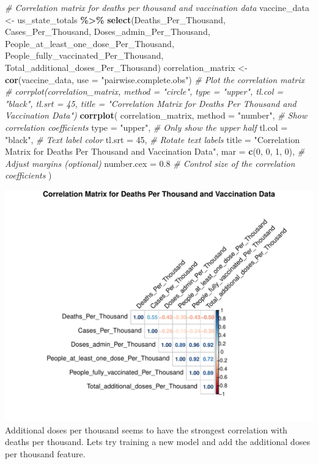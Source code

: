 \documentclass[
]{article}
\newenvironment{Shaded}{\begin{snugshade}}{\end{snugshade}}
\newcommand{\AttributeTok}[1]{\textcolor[rgb]{0.13,0.29,0.53}{#1}}
\newcommand{\CommentTok}[1]{\textcolor[rgb]{0.56,0.35,0.01}{\textit{#1}}}
\newcommand{\DecValTok}[1]{\textcolor[rgb]{0.00,0.00,0.81}{#1}}
\newcommand{\FloatTok}[1]{\textcolor[rgb]{0.00,0.00,0.81}{#1}}
\newcommand{\FunctionTok}[1]{\textcolor[rgb]{0.13,0.29,0.53}{\textbf{#1}}}
\newcommand{\NormalTok}[1]{#1}
\newcommand{\OtherTok}[1]{\textcolor[rgb]{0.56,0.35,0.01}{#1}}
\newcommand{\SpecialCharTok}[1]{\textcolor[rgb]{0.81,0.36,0.00}{\textbf{#1}}}
\newcommand{\StringTok}[1]{\textcolor[rgb]{0.31,0.60,0.02}{#1}}
\begin{document}
\begin{Shaded}
\begin{Highlighting}[]
\CommentTok{\# Correlation matrix for deaths per thousand and vaccination data}
\NormalTok{vaccine\_data }\OtherTok{\textless{}{-}}\NormalTok{ us\_state\_totals }\SpecialCharTok{\%\textgreater{}\%}
  \FunctionTok{select}\NormalTok{(Deaths\_Per\_Thousand, Cases\_Per\_Thousand, Doses\_admin\_Per\_Thousand, People\_at\_least\_one\_dose\_Per\_Thousand, People\_fully\_vaccinated\_Per\_Thousand, Total\_additional\_doses\_Per\_Thousand)}
\NormalTok{correlation\_matrix }\OtherTok{\textless{}{-}} \FunctionTok{cor}\NormalTok{(vaccine\_data, }\AttributeTok{use =} \StringTok{"pairwise.complete.obs"}\NormalTok{)}
\CommentTok{\# Plot the correlation matrix}
\CommentTok{\# corrplot(correlation\_matrix, method = "circle", type = "upper", tl.col = "black", tl.srt = 45, title = "Correlation Matrix for Deaths Per Thousand and Vaccination Data")}
\FunctionTok{corrplot}\NormalTok{(}
\NormalTok{  correlation\_matrix,}
  \AttributeTok{method =} \StringTok{"number"}\NormalTok{,        }\CommentTok{\# Show correlation coefficients}
  \AttributeTok{type =} \StringTok{"upper"}\NormalTok{,           }\CommentTok{\# Only show the upper half}
  \AttributeTok{tl.col =} \StringTok{"black"}\NormalTok{,         }\CommentTok{\# Text label color}
  \AttributeTok{tl.srt =} \DecValTok{45}\NormalTok{,              }\CommentTok{\# Rotate text labels}
  \AttributeTok{title =} \StringTok{"Correlation Matrix for Deaths Per Thousand and Vaccination Data"}\NormalTok{,}
  \AttributeTok{mar =} \FunctionTok{c}\NormalTok{(}\DecValTok{0}\NormalTok{, }\DecValTok{0}\NormalTok{, }\DecValTok{1}\NormalTok{, }\DecValTok{0}\NormalTok{),      }\CommentTok{\# Adjust margins (optional)}
  \AttributeTok{number.cex =} \FloatTok{0.8}          \CommentTok{\# Control size of the correlation coefficients}
\NormalTok{)}
\end{Highlighting}
\end{Shaded}

\includegraphics{covid-data-analysis_files/figure-latex/vaccine-correlation-1.pdf}
Additional doses per thousand seems to have the strongest correlation
with deaths per thousand. Lets try training a new model and add the
additional doses per thousand feature.
\end{document}

